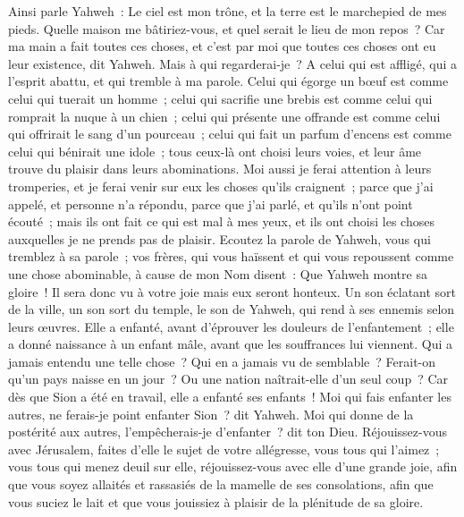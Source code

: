 \begin{multicols}{2}
\VerseOne{}Ainsi parle Yahweh~: Le ciel est mon trône, et la terre est le marchepied de mes pieds. Quelle maison me bâtiriez-vous, et quel serait le lieu de mon repos~?
Car ma main a fait toutes ces choses, et c'est par moi que toutes ces choses ont eu leur existence, dit Yahweh. Mais à qui regarderai-je~? A celui qui est affligé, qui a l'esprit abattu, et qui tremble à ma parole.
Celui qui égorge un bœuf est comme celui qui tuerait un homme~; celui qui sacrifie une brebis est comme celui qui romprait la nuque à un chien~; celui qui présente une offrande est comme celui qui offrirait le sang d'un pourceau~; celui qui fait un parfum d'encens est comme celui qui bénirait une idole~; tous ceux-là ont choisi leurs voies, et leur âme trouve du plaisir dans leurs abominations.
Moi aussi je ferai attention à leurs tromperies, et je ferai venir sur eux les choses qu'ils craignent~; parce que j'ai appelé, et personne n'a répondu, parce que j'ai parlé, et qu'ils n'ont point écouté~; mais ils ont fait ce qui est mal à mes yeux, et ils ont choisi les choses auxquelles je ne prends pas de plaisir. 
Ecoutez la parole de Yahweh, vous qui tremblez à sa parole~; vos frères, qui vous haïssent et qui vous repoussent comme une chose abominable, à cause de mon Nom disent~: Que Yahweh montre sa gloire~! Il sera donc vu à votre joie mais eux seront honteux. 
Un son éclatant sort de la ville, un son sort du temple, le son de Yahweh, qui rend à ses ennemis selon leurs œuvres.
Elle a enfanté, avant d'éprouver les douleurs de l'enfantement~; elle a donné naissance à un enfant mâle, avant que les souffrances lui viennent.
Qui a jamais entendu une telle chose~? Qui en a jamais vu de semblable~? Ferait-on qu'un pays naisse en un jour~? Ou une nation naîtrait-elle d'un seul coup~? Car dès que Sion a été en travail, elle a enfanté ses enfants~!
Moi qui fais enfanter les autres, ne ferais-je point enfanter Sion~? dit Yahweh. Moi qui donne de la postérité aux autres, l'empêcherais-je d'enfanter~? dit ton Dieu.
Réjouissez-vous avec Jérusalem, faites d'elle le sujet de votre allégresse, vous tous qui l'aimez~; vous tous qui menez deuil sur elle, réjouissez-vous avec elle d'une grande joie,
afin que vous soyez allaités et rassasiés de la mamelle de ses consolations, afin que vous suciez le lait et que vous jouissiez à plaisir de la plénitude de sa gloire.

\end{multicols}
